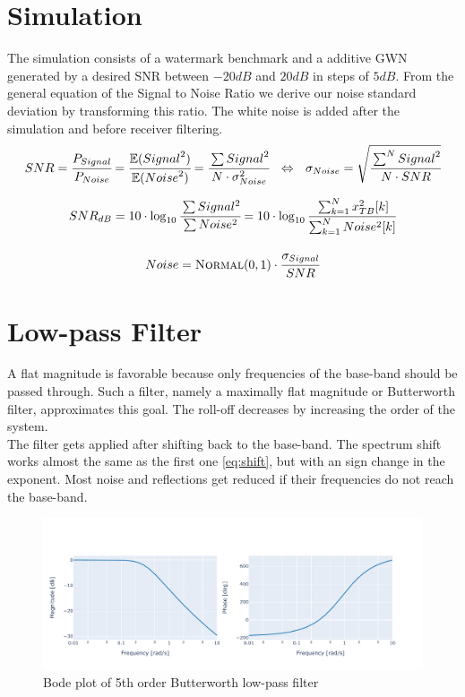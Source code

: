 \section{Simulation}
The simulation consists of a watermark benchmark \cite{watermark15} and a additive GWN generated by a desired SNR between $-20dB$ and $20dB$ in steps of $5dB$. From the general equation of the Signal to Noise Ratio we derive our noise standard deviation by transforming this ratio. The white noise is added after the simulation and before receiver filtering.
\begin{equation}
	SNR=\cfrac{P_{Signal}}{P_{Noise}}=\cfrac{\mathbb{E}({Signal}^2)}{\mathbb{E}({Noise}^2)}=\cfrac{\sum {Signal}^2}{N\cdot\sigma_{Noise}^2}~~\Leftrightarrow~~\sigma_{Noise}=\sqrt{\cfrac{\sum^N {Signal}^2}{N\cdot SNR}}
\end{equation}

\begin{equation}
	SNR_{dB}=10\cdot\log_{10}\cfrac{\sum Signal^2}{\sum Noise^2}=10\cdot\log_{10}\cfrac{\sum^N_{k=1} x_{TB}^2[k]}{\sum^N_{k=1} Noise^2[k]}
\end{equation}

\begin{equation}
	Noise=\text{\textsc{Normal}}(0,1)\cdot \cfrac{\sigma_{Signal}}{SNR}
\end{equation}


\section{Low-pass Filter}

A flat magnitude is favorable because only frequencies of the base-band should be passed through. Such a filter, namely a maximally flat magnitude or Butterworth filter, approximates this goal. The roll-off decreases by increasing the order of the system.\\
The filter gets applied after shifting back to the base-band. The spectrum shift works almost the same as the first one \ref{eq:shift}, but with an sign change in the exponent. Most noise and reflections get reduced if their frequencies do not reach the base-band.
\begin{figure}[h]
	\includegraphics[width=\linewidth]{images/bode}
	
	\caption{Bode plot of 5th order Butterworth low-pass filter}
	\label{fig:bode}
\end{figure}

